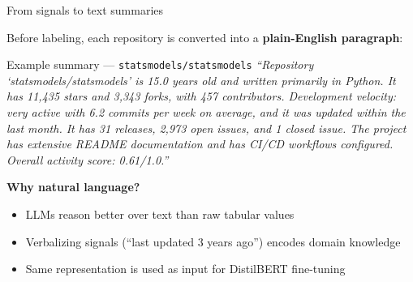 \begin{frame}{From signals to text summaries}

  Before labeling, each repository is converted into a \textbf{plain-English paragraph}:

  \bigskip
  \begin{exampleblock}{Example summary — \texttt{statsmodels/statsmodels}}
    \small
    \textit{``Repository `statsmodels/statsmodels' is 15.0 years old and written primarily in Python.
    It has 11,435 stars and 3,343 forks, with 457 contributors. Development velocity: very active
    with 6.2 commits per week on average, and it was updated within the last month. It has 31
    releases, 2,973 open issues, and 1 closed issue. The project has extensive README documentation
    and has CI/CD workflows configured. Overall activity score: 0.61/1.0.''}
  \end{exampleblock}

  \bigskip
  \textbf{Why natural language?}
  \begin{itemize}
    \item LLMs reason better over text than raw tabular values
    \item Verbalizing signals (``last updated 3 years ago'') encodes domain knowledge
    \item Same representation is used as input for DistilBERT fine-tuning
  \end{itemize}

\end{frame}


